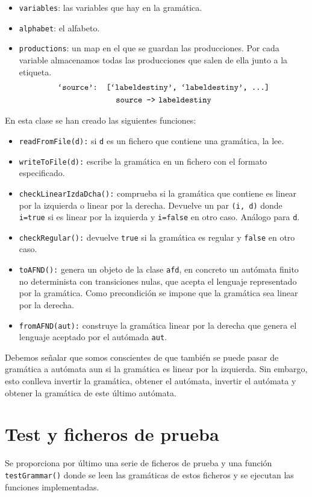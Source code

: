 \documentclass[10pt,a4paper]{article}
\begin{document}
\begin{itemize}
\item \texttt{variables}: las variables que hay en la gramática.
\item \texttt{alphabet}: el alfabeto.
\item \texttt{productions}: un map en el que se guardan las producciones. Por cada variable almacenamos todas las producciones que salen de ella junto a la etiqueta.
\begin{gather*}
\texttt{`source': [`labeldestiny', `labeldestiny', ...]}\\
\texttt{source ->\thinspace \thinspace labeldestiny}
\end{gather*}
\end{itemize}
En esta clase se han creado las siguientes funciones: 
\begin{itemize}
\item \texttt{readFromFile(d):} si \texttt{d} es un fichero que contiene una gramática, la lee.
\item \texttt{writeToFile(d):} escribe la gramática en un fichero con el formato especificado. 
\item \texttt{checkLinearIzdaDcha():} comprueba si la gramática que contiene es linear por la izquierda o linear por la derecha. Devuelve un par \texttt{(i, d)} donde \texttt{i=true} si es linear por la izquierda y \texttt{i=false} en otro caso. Análogo para \texttt{d}.
\item \texttt{checkRegular():} devuelve \texttt{true} si la gramática es regular y \texttt{false} en otro caso.
\item \texttt{toAFND():} genera un objeto de la clase \texttt{afd}, en concreto un autómata finito no determinista con transiciones nulas, que acepta el lenguaje representado por la gramática. Como precondición se impone que la gramática sea linear por la derecha.
\item \texttt{fromAFND(aut):} construye la gramática linear por la derecha que genera el lenguaje aceptado por el autómada \texttt{aut}. 
\end{itemize}

Debemos señalar que somos conscientes de que también se puede pasar de gramática a autómata aun si la gramática es linear por la izquierda. Sin embargo, esto conlleva invertir la gramática, obtener el autómata, invertir el autómata y obtener la gramática de este último autómata.

\section{Test y ficheros de prueba}
Se proporciona por último una serie de ficheros de prueba y una función \texttt{testGrammar()} donde se leen las gramáticas de estos ficheros y se ejecutan las funciones implementadas. 
\end{document}
